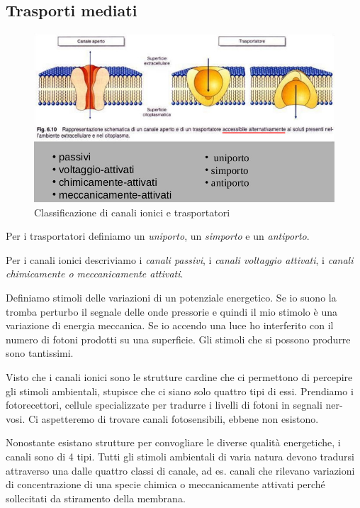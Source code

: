 \documentclass[a4paper,12pt]{article}
\begin{document}
\subsection{Trasporti mediati}
\begin{figure}[H]
\centering
\includegraphics[scale=0.4]{immagine/classificazione.jpg}
\caption{Classificazione di canali ionici e trasportatori}
\end{figure}

Per i trasportatori definiamo un
\emph{uniporto}, un \emph{simporto} e un \emph{antiporto}. 

Per i canali ionici descriviamo i
\emph{canali passivi}, i \emph{canali voltaggio attivati}, i \emph{canali chimicamente o meccanicamente attivati}.

Definiamo stimoli delle variazioni di
un potenziale energetico. Se io suono la tromba perturbo il
segnale delle onde pressorie e
quindi il mio stimolo è una variazione di energia meccanica. Se io accendo una luce ho interferito con il numero di fotoni prodotti su una superficie. Gli stimoli che si possono produrre sono tantissimi.

Visto che i canali ionici sono le strutture cardine che ci permettono di percepire gli
stimoli ambientali, stupisce che ci siano solo quattro tipi di essi.
Prendiamo i fotorecettori, cellule specializzate per tradurre i livelli di fotoni in segnali ner-
vosi. Ci aspetteremo di trovare canali fotosensibili, ebbene non esistono.

Nonostante esistano strutture per convogliare le diverse qualità energetiche, i canali sono
di 4 tipi. Tutti gli stimoli ambientali di varia natura devono tradursi attraverso una dalle
quattro classi di canale, ad es. canali che rilevano variazioni di concentrazione di una specie
chimica o meccanicamente attivati perché sollecitati da stiramento della membrana.
\end{document}
